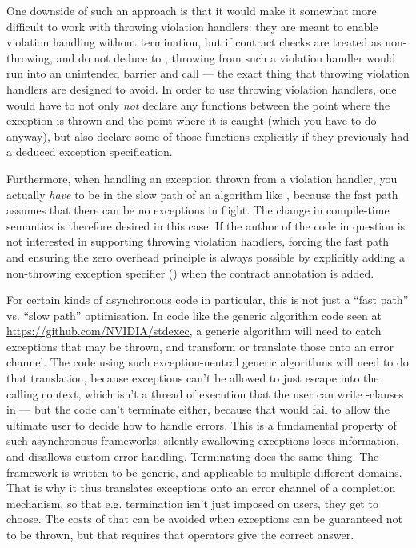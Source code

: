 One downside of such an approach is that it would make it somewhat more difficult to work with throwing violation handlers: they are meant to enable violation handling without termination, but if contract checks are treated as non-throwing, and do not deduce to , throwing from such a violation handler would run into an unintended  barrier and call  --- the exact thing that throwing violation handlers are designed to avoid. In order to use throwing violation handlers, one would have to not only \emph{not} declare any functions between the point where the exception is thrown and the point where it is caught  (which you have to do anyway), but also declare some of those functions explicitly  if they previously had a deduced exception specification.

Furthermore, when handling an exception thrown from a violation handler, you actually \emph{have} to be in the slow path of an algorithm like , because the fast path assumes that there can be no exceptions in flight. The change in compile-time semantics is therefore desired in this case. If the author of the code in question is not interested in supporting throwing violation handlers, forcing the fast path and ensuring the zero overhead principle is always possible by explicitly adding a non-throwing exception specifier () when the contract annotation is added.

For certain kinds of asynchronous code in particular, this is not just a ``fast path'' vs. ``slow path'' optimisation. In code like the generic algorithm code seen at \href{https://github.com/NVIDIA/stdexec}{https://github.com/NVIDIA/stdexec}, a generic algorithm will need to catch exceptions that may be thrown, and transform or translate those onto an error channel. The code using such  exception-neutral generic algorithms will need to do that translation, because exceptions can’t be allowed to just escape into the calling context, which isn’t a thread of execution that the user can write -clauses in --- but the code can’t terminate either, because that would fail to allow the ultimate user to decide how to handle errors. This is a fundamental property of such asynchronous frameworks: silently swallowing exceptions loses information, and disallows custom error handling. Terminating does the same thing. The framework is written to be generic, and applicable to multiple different domains. That is why it thus translates exceptions onto an error channel of a completion mechanism, so that e.g. termination isn’t just imposed on users, they get to choose. The costs of that can be avoided when exceptions can be guaranteed not to be thrown, but that requires that  operators give the correct answer.

